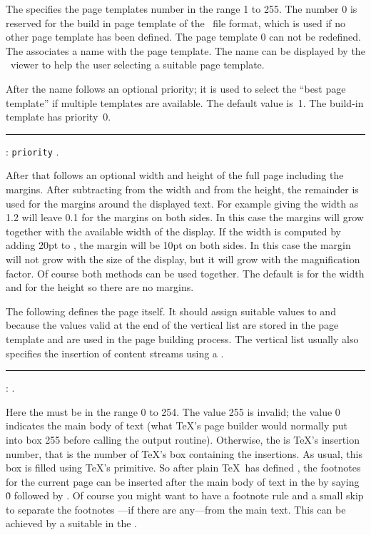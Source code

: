 The  specifies the page templates number in the range 1
to 255.  The number 0 is reserved for the build in page template of
the \HINT\ file format, which is used if no other page template has
been defined. The page template 0 can not be redefined.
The  associates a name with the page template.  The name can
be displayed by the \HINT\ viewer to help the user selecting a
suitable page template.

After the name follows an optional priority; it is used to select the
``best page template'' if multiple templates are available. The
default value is~1. The build-in template has priority~0.

\medskip
\rule{}: {\tt priority} .
\medskip


After that follows an optional width and height of the full page
including the margins.  After subtracting  from the width
and  from the height, the remainder is used for the margins
around the displayed text.  For example giving the width as
1.2 will leave 0.1 for the margins on both sides.
In this case the margins will grow together with the available width
of the display.  If the width is computed by adding 20pt
to , the margin will be 10pt on both sides.  In this case
the margin will not grow with the size of the display, but it will
grow with the magnification factor.  Of course both methods can be
used together.  The default is  for the width and 
for the height so there are no margins.

The following  defines the page itself. It should assign suitable values
to  and  because the values valid at the end of the vertical list
are stored in the page template and are used in the page building process. 
The vertical list usually also specifies the insertion of content streams
using a .

\medskip
\rule{}:
   .
\medskip

Here  the  must be in the range 0 to 254. The value 255 is invalid;
the value 0 indicates the main body of text (what \TeX's page builder would normally put into
box 255 before calling the output routine).
Otherwise, the  is \TeX's insertion number, that is the number of \TeX's box 
containing the insertions. As usual, this box is filled using \TeX's  primitive. 
So after plain \TeX\ has defined ,
the footnotes for the current page can be inserted after the main body of text in the 
by saying \.0 followed by .
Of course you might want to have a footnote rule and a small skip to separate the 
footnotes ---if there are any---from the main text. This can be achieved by a suitable
 in the .


